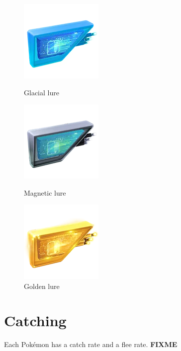 \begin{figure}[h!]
  \begin{minipage}[t]{0.3\textwidth}
    \begin{center}
    \includegraphics[scale=.4]{images/glaciallure.png}
    \end{center}
    \caption*{Glacial lure}
    \label{fig:lure}
  \end{minipage}
  \begin{minipage}[t]{0.3\textwidth}
    \begin{center}
    \includegraphics[scale=.4]{images/magneticlure.png}
    \end{center}
    \caption*{Magnetic lure}
    \label{fig:rainylure}
  \end{minipage}
  \begin{minipage}[t]{0.3\textwidth}
    \begin{center}
    \includegraphics[scale=.4]{images/goldenlure.png}
    \end{center}
    \caption*{Golden lure}
    \label{fig:goldenlure}
  \end{minipage}
\end{figure}

\section{Catching}
\label{sec:catch}
Each Pokémon has a catch rate and a flee rate.
\textbf{FIXME}
